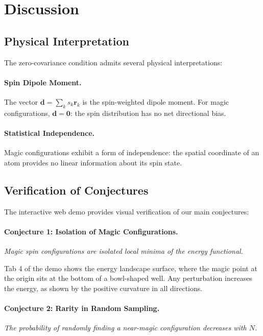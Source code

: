 \section{Discussion}
\label{sec:discussion}

\subsection{Physical Interpretation}

The zero-covariance condition admits several physical interpretations:

\paragraph{Spin Dipole Moment.} The vector $\mathbf{d} = \sum_k s_k \mathbf{r}_k$ is the spin-weighted dipole moment. For magic configurations, $\mathbf{d} = \mathbf{0}$: the spin distribution has no net directional bias.

\paragraph{Statistical Independence.} Magic configurations exhibit a form of independence: the spatial coordinate of an atom provides no linear information about its spin state.

\subsection{Verification of Conjectures}

The interactive web demo provides visual verification of our main conjectures:

\paragraph{Conjecture 1: Isolation of Magic Configurations.}
\emph{Magic spin configurations are isolated local minima of the energy functional.}

Tab 4 of the demo shows the energy landscape surface, where the magic point at the origin sits at the bottom of a bowl-shaped well. Any perturbation increases the energy, as shown by the positive curvature in all directions.

\paragraph{Conjecture 2: Rarity in Random Sampling.}
\emph{The probability of randomly finding a near-magic configuration decreases with $N$.}


